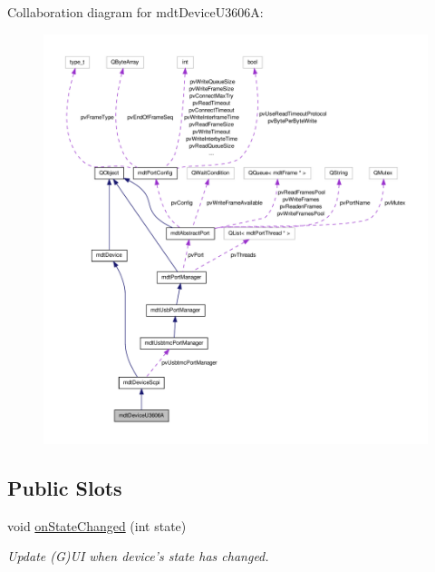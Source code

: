 Collaboration diagram for mdt\-Device\-U3606\-A\-:
\nopagebreak
\begin{figure}[H]
\begin{center}
\leavevmode
\includegraphics[width=350pt]{classmdt_device_u3606_a__coll__graph}
\end{center}
\end{figure}
\subsection*{Public Slots}
\begin{DoxyCompactItemize}
\item 
void \hyperlink{classmdt_device_u3606_a_a94a6f8b3f64cd35b33204c66816f3f6a}{on\-State\-Changed} (int state)
\begin{DoxyCompactList}\small\item\em Update (G)U\-I when device's state has changed. \end{DoxyCompactList}\end{DoxyCompactItemize}
